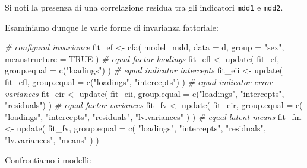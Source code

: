 \documentclass[
  11pt,
]{krantz}
\makeatletter
\newenvironment{Shaded}{\begin{snugshade}}{\end{snugshade}}
\newcommand{\AttributeTok}[1]{\textcolor[rgb]{0.61,0.61,0.61}{#1}}
\newcommand{\CommentTok}[1]{\textcolor[rgb]{0.37,0.37,0.37}{\textit{#1}}}
\newcommand{\ConstantTok}[1]{\textcolor[rgb]{0,0,0}{#1}}
\newcommand{\FunctionTok}[1]{\textcolor[rgb]{0,0,0}{#1}}
\newcommand{\NormalTok}[1]{#1}
\newcommand{\OtherTok}[1]{\textcolor[rgb]{0.37,0.37,0.37}{#1}}
\newcommand{\StringTok}[1]{\textcolor[rgb]{0.5,0.5,0.5}{#1}}
\newenvironment{kframe}{%
\medskip{}
\setlength{\fboxsep}{.8em}
 \def\at@end@of@kframe{}%
 \ifinner\ifhmode%
  \def\at@end@of@kframe{\end{minipage}}%
  \begin{minipage}{\columnwidth}%
 \fi\fi%
 \def\FrameCommand##1{\hskip\@totalleftmargin \hskip-\fboxsep
 \colorbox{shadecolor}{##1}\hskip-\fboxsep
     \hskip-\linewidth \hskip-\@totalleftmargin \hskip\columnwidth}%
 \MakeFramed {\advance\hsize-\width
   \@totalleftmargin\z@ \linewidth\hsize
   \@setminipage}}%
 {\par\unskip\endMakeFramed%
 \at@end@of@kframe}
\renewenvironment{Shaded}{\begin{kframe}}{\end{kframe}}
\theoremstyle{definition}
\theoremstyle{definition}
\theoremstyle{definition}
\theoremstyle{definition}
\theoremstyle{remark}
\makeatother
\begin{document}
Si noti la presenza di una correlazione residua tra gli indicatori \texttt{mdd1} e \texttt{mdd2}.

Esaminiamo dunque le varie forme di invarianza fattoriale:

\begin{Shaded}
\begin{Highlighting}[]
\CommentTok{\# configural invariance}
\NormalTok{fit\_ef }\OtherTok{\textless{}{-}} \FunctionTok{cfa}\NormalTok{(}
\NormalTok{  model\_mdd,}
  \AttributeTok{data =}\NormalTok{ d,}
  \AttributeTok{group =} \StringTok{"sex"}\NormalTok{,}
  \AttributeTok{meanstructure =} \ConstantTok{TRUE}
\NormalTok{)}
\CommentTok{\# equal factor laodings}
\NormalTok{fit\_efl }\OtherTok{\textless{}{-}} \FunctionTok{update}\NormalTok{(}
\NormalTok{  fit\_ef,}
  \AttributeTok{group.equal =} \FunctionTok{c}\NormalTok{(}\StringTok{"loadings"}\NormalTok{)}
\NormalTok{)}
\CommentTok{\# equal indicator intercepts}
\NormalTok{fit\_eii }\OtherTok{\textless{}{-}} \FunctionTok{update}\NormalTok{(}
\NormalTok{  fit\_efl,}
  \AttributeTok{group.equal =} \FunctionTok{c}\NormalTok{(}\StringTok{"loadings"}\NormalTok{, }\StringTok{"intercepts"}\NormalTok{)}
\NormalTok{)}
\CommentTok{\# equal indicator error variances}
\NormalTok{fit\_eir }\OtherTok{\textless{}{-}} \FunctionTok{update}\NormalTok{(}
\NormalTok{  fit\_eii,}
  \AttributeTok{group.equal =} \FunctionTok{c}\NormalTok{(}\StringTok{"loadings"}\NormalTok{, }\StringTok{"intercepts"}\NormalTok{, }\StringTok{"residuals"}\NormalTok{)}
\NormalTok{)}
\CommentTok{\# equal factor variances}
\NormalTok{fit\_fv }\OtherTok{\textless{}{-}} \FunctionTok{update}\NormalTok{(}
\NormalTok{  fit\_eir,}
  \AttributeTok{group.equal =} \FunctionTok{c}\NormalTok{(}
    \StringTok{"loadings"}\NormalTok{, }\StringTok{"intercepts"}\NormalTok{, }\StringTok{"residuals"}\NormalTok{,}
    \StringTok{"lv.variances"}
\NormalTok{  )}
\NormalTok{)}
\CommentTok{\# equal latent means}
\NormalTok{fit\_fm }\OtherTok{\textless{}{-}} \FunctionTok{update}\NormalTok{(}
\NormalTok{  fit\_fv,}
  \AttributeTok{group.equal =} \FunctionTok{c}\NormalTok{(}
    \StringTok{"loadings"}\NormalTok{, }\StringTok{"intercepts"}\NormalTok{, }\StringTok{"residuals"}\NormalTok{,}
    \StringTok{"lv.variances"}\NormalTok{, }\StringTok{"means"}
\NormalTok{  )}
\NormalTok{)}
\end{Highlighting}
\end{Shaded}

Confrontiamo i modelli:
\end{document}
